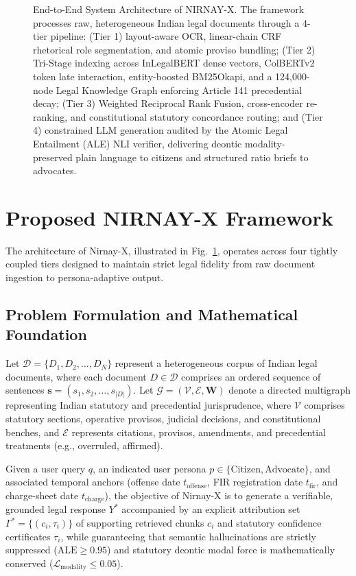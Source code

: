 \documentclass[conference]{IEEEtran}
\begin{document}
\begin{figure}[!t]
\begin{tikzpicture}
\end{tikzpicture}
\caption{End-to-End System Architecture of NIRNAY-X. The framework processes raw, heterogeneous Indian legal documents through a 4-tier pipeline: (Tier 1) layout-aware OCR, linear-chain CRF rhetorical role segmentation, and atomic proviso bundling; (Tier 2) Tri-Stage indexing across InLegalBERT dense vectors, ColBERTv2 token late interaction, entity-boosted BM25Okapi, and a 124,000-node Legal Knowledge Graph enforcing Article 141 precedential decay; (Tier 3) Weighted Reciprocal Rank Fusion, cross-encoder re-ranking, and constitutional statutory concordance routing; and (Tier 4) constrained LLM generation audited by the Atomic Legal Entailment (ALE) NLI verifier, delivering deontic modality-preserved plain language to citizens and structured ratio briefs to advocates.}
\label{fig:architecture}
\end{figure}

\section{Proposed NIRNAY-X Framework}
The architecture of Nirnay-X, illustrated in Fig.~\ref{fig:architecture}, operates across four tightly coupled tiers designed to maintain strict legal fidelity from raw document ingestion to persona-adaptive output.

\subsection{Problem Formulation and Mathematical Foundation}
Let $\mathcal{D} = \{D_1, D_2, \dots, D_N\}$ represent a heterogeneous corpus of Indian legal documents, where each document $D \in \mathcal{D}$ comprises an ordered sequence of sentences $\mathbf{s} = (s_1, s_2, \dots, s_{|D|})$. Let $\mathcal{G} = (\mathcal{V}, \mathcal{E}, \mathbf{W})$ denote a directed multigraph representing Indian statutory and precedential jurisprudence, where $\mathcal{V}$ comprises statutory sections, operative provisos, judicial decisions, and constitutional benches, and $\mathcal{E}$ represents citations, provisos, amendments, and precedential treatments (e.g., overruled, affirmed).

Given a user query $q$, an indicated user persona $p \in \{\text{Citizen}, \text{Advocate}\}$, and associated temporal anchors (offense date $t_{\text{offense}}$, FIR registration date $t_{\text{fir}}$, and charge-sheet date $t_{\text{charge}}$), the objective of Nirnay-X is to generate a verifiable, grounded legal response $Y^*$ accompanied by an explicit attribution set $\Gamma^* = \{(c_i, \tau_i)\}$ of supporting retrieved chunks $c_i$ and statutory confidence certificates $\tau_i$, while guaranteeing that semantic hallucinations are strictly suppressed ($\text{ALE} \ge 0.95$) and statutory deontic modal force is mathematically conserved ($\mathcal{L}_{\text{modality}} \le 0.05$).
\end{document}
